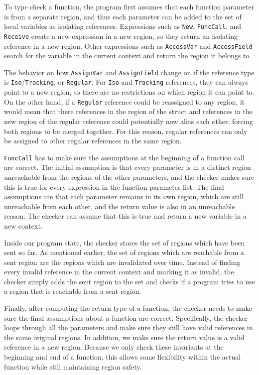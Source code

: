 \documentclass{article}
\begin{document}
  To type check a function,
    the program first assumes that each function parameter is from a separate region,
    and thus each parameter can be added to the set of local variables as isolating references.
  Expressions such as \verb+New+, \verb+FuncCall+, and \verb+Receive+ create a new expression
    in a new region,
    so they return an isolating reference in a new region.
  Other expressions such as \verb+AccessVar+ and \verb+AccessField+ search for the variable
    in the current context
    and return the region it belongs to.

  The behavior on how \verb+AssignVar+ and \verb+AssignField+ change
    on if the reference type is \verb+Iso+/\verb+Tracking+, or \verb+Regular+.
  For \verb+Iso+ and \verb+Tracking+ references,
    they can always point to a new region,
    so there are no restrictions on which region it can point to.
  On the other hand,
    if a \verb+Regular+ reference could be reassigned to any region,
    it would mean that there references in the region of the struct
    and references in the new region of the regular reference 
    could potentially now alias each other,
    forcing both regions to be merged together.
  For this reason,
    regular references can only be assigned to other regular references in the same region.

  \verb+FuncCall+ has to make sure the assumptions at the beginning of a function call
    are correct.
  The initial assumption is that every parameter is in a distinct region
    unreachable from the regions of the other parameters,
    and the checker makes sure this is true for every expression in the function parameter list.
  The final assumptions are that each parameter remains in its own region,
    which are still unreachable from each other,
    and the return value is also in an unreachable reason.
  The checker can assume that this is true
    and return a new variable in a new context.

  Inside our program state,
    the checker stores the set of regions which have been sent so far.
  As mentioned earlier,
    the set of regions which are reachable from a sent region
    are the regions which are invalidated over time.
  Instead of finding every invalid reference in the current context and marking it as invalid,
    the checker simply adds the sent region to the set
    and checks if a program tries to use a region that is reachable from a sent region.

  Finally,
    after computing the return type of a function,
    the checker needs to make sure the final assumptions about a function are correct.
  Specifically,
    the checker loops through all the parameters
    and make sure they still have valid references
    in the same original regions.
  In addition,
    we make sure the return value is a valid reference in a new region.
  Because we only check these invariants at the beginning and end of a function,
    this allows some flexibility within the actual function
    while still maintaining region safety.
\end{document}
